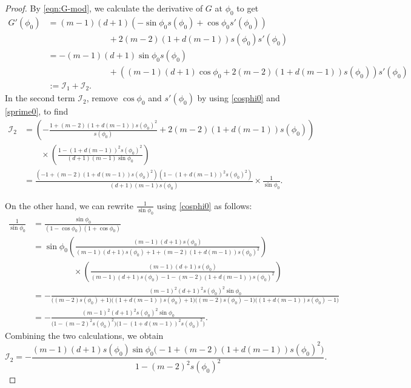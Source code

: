 \documentclass[11pt]{amsart}
\newcommand{\dm}{d} %
\begin{document}
\begin{proof}
By \eqref{eqn:G-mod}, we calculate the derivative of $G$ at $\phi_0$ to get
\begin{equation}
\label{eqn:Gp-phi0}
\begin{aligned}
G'(\phi_0)&=(m-1)(\dm+1)\left(-\sin\phi_0 s(\phi_0)+\cos\phi_0 s'(\phi_0)\right)\\
&\hspace{3cm}+2(m-2)(1+\dm(m-1))s(\phi_0)s'(\phi_0)\\
&=-(m-1)(\dm+1)\sin\phi_0 s(\phi_0)\\
&\hspace{3cm}+\left((m-1)(\dm+1)\cos\phi_0+2(m-2)(1+\dm(m-1))s(\phi_0)\right)s'(\phi_0)\\
&:=\mathcal{I}_1+\mathcal{I}_2.
\end{aligned}
\end{equation}
In the second term $\mathcal{I}_2$, remove $\cos\phi_0$ and $s'(\phi_0)$ by using \eqref{cosphi0} and \eqref{sprime0}, to find
\begin{align*}
\mathcal{I}_2&=\left(-\frac{1+(m-2)(1+\dm(m-1))s(\phi_0)^2}{s(\phi_0)}+2(m-2)(1+\dm(m-1))s(\phi_0)\right) \\
&\qquad \times\left(\frac{1-(1+\dm(m-1))^2s(\phi_0)^2}{(\dm+1)(m-1)\sin\phi_0}\right)\\[5pt]
&=\frac{
\left(-1+(m-2)(1+\dm(m-1))s(\phi_0)^2\right)\left(1-(1+\dm(m-1))^2s(\phi_0)^2\right)
}{(\dm+1)(m-1)s(\phi_0)}\times\frac{1}{\sin\phi_0}.
\end{align*}

On the other hand, we can rewrite $\frac{1}{\sin\phi_0}$ using \eqref{cosphi0} as follows:
\begin{align*}
\frac{1}{\sin\phi_0}&=\frac{\sin\phi_0}{(1-\cos\phi_0)(1+\cos\phi_0)}\\
&=\sin\phi_0\left(\frac{(m-1)(\dm+1)s(\phi_0)}{
(m-1)(\dm+1)s(\phi_0)+1+(m-2)(1+\dm(m-1))s(\phi_0)^2
}\right)\\[2pt]
&\hspace{2cm}\times\left(\frac{(m-1)(\dm+1)s(\phi_0)}{
(m-1)(\dm+1)s(\phi_0)-1-(m-2)(1+\dm(m-1))s(\phi_0)^2
}\right)\\[2pt]
&=-\frac{(m-1)^2(\dm+1)^2s(\phi_0)^2\sin\phi_0}{\big((m-2)s(\phi_0)+1\big)\big((1+\dm(m-1))s(\phi_0)+1\big)\big((m-2)s(\phi_0)-1\big)\big((1+\dm(m-1))s(\phi_0)-1\big)}\\
&=-\frac{(m-1)^2(\dm+1)^2s(\phi_0)^2\sin\phi_0}{\big(1-(m-2)^2s(\phi_0)^2\big)\big(1-(1+\dm(m-1))^2s(\phi_0)^2\big)}.
\end{align*}
Combining the two calculations, we obtain
\[
\mathcal{I}_2=-\frac{(m-1)(\dm+1)s(\phi_0)\sin\phi_0\big(-1+(m-2)(1+\dm(m-1))s(\phi_0)^2\big)}{1-(m-2)^2s(\phi_0)^2}.
\]


\end{proof}
\end{document}
